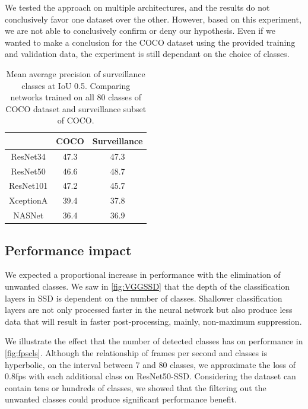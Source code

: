 We tested the approach on multiple architectures, and the results do not conclusively favor one dataset over the other. However, based on this experiment, we are not able to conclusively confirm or deny our hypothesis. Even if we wanted to make a conclusion for the COCO dataset using the provided training and validation data, the experiment is still dependant on the choice of classes.

\begin{table}[]
    \centering
    \begin{tabular}{c|c|c}
         & COCO & Surveillance  \\
         \hline
        ResNet34 & 47.3 & 47.3 \\
        ResNet50 & 46.6 & 48.7 \\
        ResNet101 & 47.2 & 45.7 \\
        XceptionA & 39.4 & 37.8 \\
        NASNet & 36.4 & 36.9 
    \end{tabular}
    \caption[SSD's precision comparison between COCO and surveillance datasets]{Mean average precision of surveillance classes at IoU 0.5. Comparing networks trained on all 80 classes of COCO dataset and surveillance subset of COCO.}
    \label{tab:ssdcocosurv}
\end{table}

\subsection{Performance impact}
We expected a proportional increase in performance with the elimination of unwanted classes. We saw in \cref{fig:VGGSSD} that the depth of the classification layers in SSD is dependent on the number of classes. Shallower classification layers are not only processed faster in the neural network but also produce less data that will result in faster post-processing, mainly, non-maximum suppression.

We illustrate the effect that the number of detected classes has on performance in \cref{fig:fpscls}. Although the relationship of frames per second and classes is hyperbolic, on the interval between 7 and 80 classes, we approximate the loss of 0.8fps with each additional class on ResNet50-SSD. Considering the dataset can contain tens or hundreds of classes, we showed that the filtering out the unwanted classes could produce significant performance benefit.

